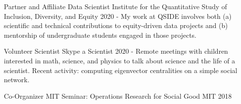 

\begin{cventries}

\cventry
    {Partner and Affiliate Data Scientist} %
    {Institute for the Quantitative Study of Inclusion, Diversity, and Equity } %
    {} %
    {2020 - } %
    {My work at QSIDE involves both (a) scientific and technical contributions to equity-driven data projects and (b) mentorship of undergraduate students engaged in those projects.}

\cventry
    {Volunteer Scientist} %
    {Skype a Scientist} %
    {} %
    {2020 - } %
    {Remote meetings with children interested in math, science, and physics to talk about science and the life of a scientist. Recent activity: computing eigenvector centralities on a simple social network.}

\cventry
    {Co-Organizer} %
    {MIT Seminar: Operations Research for Social Good} %
    {MIT} %
    {2018 } %
    {}
\end{cventries}



